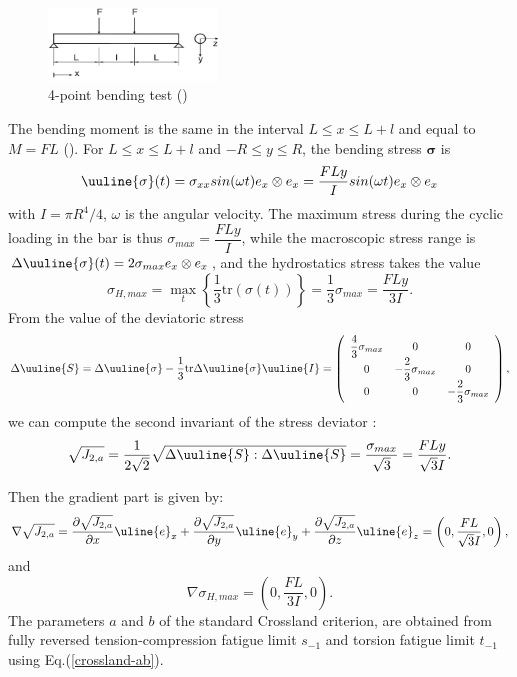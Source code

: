 \begin{figure}[h!]
	\centering
	\includegraphics[width=0.4\textwidth]{figures//fig11.jpg} 
	\caption{4-point bending test (\cite{Papadopoulos1996513}) }
	\label{fig11}
\end{figure}

The bending moment is the same in the interval $L\leqslant x \leqslant L+l$ and equal to
$M = FL$ ().
For $L\leqslant x \leqslant L+l$ and  $-R\leqslant y \leqslant R$, the bending stress $\bm{\sigma}$  is
\begin{equation}
	\uuline{\sigma}(t)=\sigma_{xx}sin(\omega t)e_x\otimes e_x=\dfrac{FLy}{I}sin(\omega t) e_x\otimes e_x \label{bending4} \end{equation}
with $I=\pi R^4/4$, $\omega$ is the angular velocity.  The maximum stress during the cyclic loading in the bar  is thus 
$ \sigma_{max}=\dfrac{FLy}{I}$, 
while the macroscopic stress range is $ \Delta\uuline{\sigma}(t)=2\sigma_{max}e_x\otimes e_x $, and the 
hydrostatics stress takes the value
\begin{equation}
	\sigma_{H,max}=\max\limits_{t}\left\lbrace \dfrac{1}{3}\textrm{tr}(\sigma(t))\right\rbrace =\dfrac{1}{3}\sigma_{max}=\dfrac{FLy}{3I}.
\end{equation}
From the value of  the deviatoric stress
\begin{equation} 
	\Delta\uuline{ S}=\Delta\uuline{\sigma}-\dfrac{1}{3}\textrm{tr}\Delta\uuline{\sigma}\uuline{I}=
	\left(
	\begin{array}{ccc}
		\dfrac{4}{3}\sigma_{max} & 0 & 0\\
		0 & -\dfrac{2}{3}\sigma_{max} & 0\\ 
		0 & 0 & -\dfrac{2}{3}\sigma_{max}\\
	\end{array}\right) ,
\end{equation}
we can compute the second invariant of the stress deviator :
\begin{equation}
	\sqrt{J_{2,a}}=\dfrac{1}{2\sqrt{2}}\sqrt{\Delta \uuline{S}:\Delta \uuline{S}}=\dfrac{\sigma_{max}}{\sqrt{3}} =\dfrac{FLy}{\sqrt{3}I} .
\end{equation}


Then the gradient part is given by:
\begin{equation}
	\nabla\sqrt{J_{2,a}}=\dfrac{\partial\sqrt{J_{2,a}}}{\partial x}\uline{e}_x+\dfrac{\partial\sqrt{J_{2,a}}}{\partial y}\uline{e}_y+\dfrac{\partial\sqrt{J_{2,a}}}{\partial z}\uline{e}_z=\left( 0,\dfrac{FL}{\sqrt{3}I},0\right)  ,
\end{equation}
and
\begin{equation}
	\nabla \sigma_{H,max}=(0,\dfrac{FL}{3I},0).
\end{equation}
The parameters $a$ and $b$ of the standard Crossland criterion, are obtained from fully reversed tension-compression fatigue limit $s_{-1}$  and torsion fatigue limit $t_{-1}$ using Eq.(\ref{crossland-ab}).

